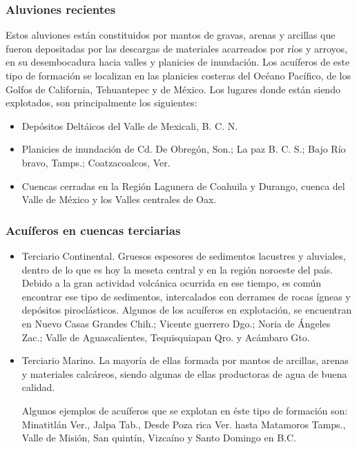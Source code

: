 \subsubsection{Aluviones recientes}
Estos aluviones están constituidos por mantos de gravas, arenas y arcillas que fueron depositadas por las descargas de materiales acarreados por ríos y arroyos, en su desembocadura hacia valles y planicies de inundación. Los acuíferos de este tipo de formación se localizan en las planicies costeras del Océano Pacífico, de los Golfos de California, Tehuantepec y de México. Los lugares donde están siendo explotados, son principalmente los siguientes:
\begin{itemize}
    \item Depósitos Deltáicos del Valle de Mexicali, B. C. N.
    \item Planicies de inundación de Cd. De Obregón, Son.; La paz B. C. S.; Bajo Río bravo, Tamps.; Coatzacoalcos, Ver.
    \item Cuencas cerradas en la Región Lagunera de Coahuila y Durango, cuenca del Valle de México y los Valles centrales de Oax.
\end{itemize}
\subsubsection{Acuíferos en cuencas terciarias} 
\begin{itemize}
    \item Terciario Continental. Gruesos espesores de sedimentos lacustres y aluviales, dentro de lo que es hoy la meseta central y en la región noroeste del país. Debido a la gran actividad volcánica ocurrida en ese tiempo, es común encontrar ese tipo de sedimentos, intercalados con derrames de rocas ígneas y depósitos piroclásticos. Algunos de los acuíferos en explotación, se encuentran en Nuevo Casas Grandes Chih.; Vicente guerrero Dgo.; Noria de Ángeles Zac.; Valle de Aguascalientes, Tequisquiapan Qro. y Acámbaro Gto.
    \item Terciario Marino. La mayoría de ellas formada por mantos de arcillas, arenas y materiales calcáreos, siendo algunas de ellas productoras de agua de buena calidad.
    
    Algunos ejemplos de acuíferos que se explotan en éste tipo de formación son: Minatitlán Ver., Jalpa Tab., Desde Poza rica Ver. hasta Matamoros Tamps., Valle de Misión, San quintín, Vizcaíno y Santo Domingo en B.C.
\end{itemize}

